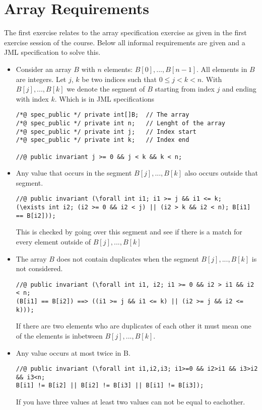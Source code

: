 \documentclass[a4paper]{article}
\begin{document}
\section{Array Requirements}
The first exercise relates to the array specification exercise as given in the first exercise session of the course. Below all informal requirements are given and a JML specification to solve this.
\begin{itemize}
\item Consider an array $B$ with $n$ elements: $B[0], . . . , B[n-1]$.
All elements in $B$ are integers. Let $j$, $k$ be two indices such that $0 \leq j < k < n$.
With $B[j], . . . , B[k]$ we denote the segment of $B$ starting from index $j$ and ending with index $k$. Which is in JML specifications
\begin{lstlisting}
/*@ spec_public */ private int[]B;	// The array
/*@ spec_public */ private int n;	// Lenght of the array
/*@ spec_public */ private int j;	// Index start
/*@ spec_public */ private int k;	// Index end
	
//@ public invariant j >= 0 && j < k && k < n;
\end{lstlisting}

	\item Any value that occurs in the segment $B[j], . . . ,B[k]$ also occurs outside that segment.
	\begin{lstlisting}
//@ public invariant (\forall int i1; i1 >= j && i1 <= k;
(\exists int i2; (i2 >= 0 && i2 < j) || (i2 > k && i2 < n); B[i1] == B[i2]));
	\end{lstlisting}
	This is checked by going over this segment and see if there is a match for every element outside of $B[j], . . . , B[k]$
	
	\item The array $B$ does not contain duplicates when the segment $B[j], . . . , B[k]$ is not considered.
	\begin{lstlisting}
//@ public invariant (\forall int i1, i2; i1 >= 0 && i2 > i1 && i2 < n;
(B[i1] == B[i2]) ==> ((i1 >= j && i1 <= k) || (i2 >= j && i2 <= k)));
	\end{lstlisting}
	If there are two elements who are duplicates of each other it must mean one of the elements is inbetween $B[j], . . . , B[k]$.

	\item Any value occurs at most twice in B.
	\begin{lstlisting}
//@ public invariant (\forall int i1,i2,i3; i1>=0 && i2>i1 && i3>i2 && i3<n;
B[i1] != B[i2] || B[i2] != B[i3] || B[i1] != B[i3]);	
	\end{lstlisting}
	If you have three values at least two values can not be equal to eachother.
	

\end{itemize}
\end{document}
